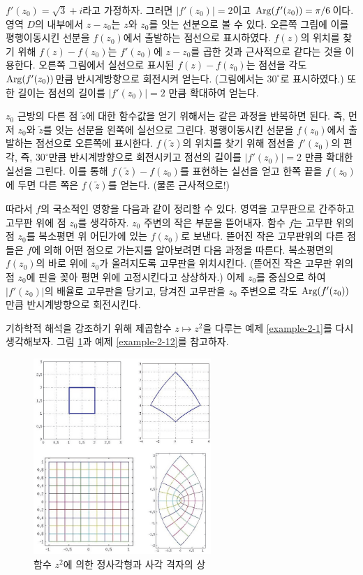 $f'(z_0) = \sqrt{3} +i$라고 가정하자.
그러면 $|f'(z_0)| = 2$이고 $\mathop{\mathrm{Arg}}(f'(z_0))=\pi/6$이다.
영역 $D$의 내부에서 $z-z_0$는 $z$와 $z_0$를 잇는 선분으로 볼 수 있다.
오른쪽 그림에 이를 평행이동시킨 선분을 $f(z_0)$에서 출발하는 점선으로 표시하였다.
$f(z)$의 위치를 찾기 위해
$f(z)-f(z_0)$는 $f'(z_0)$에 $z-z_0$를 곱한 것과 근사적으로 같다는 것을 이용한다.
오른쪽 그림에서 실선으로 표시된 $f(z)-f(z_0)$는
점선을 각도 $\mathop{\mathrm{Arg}}(f'(z_0))$만큼 반시계방향으로 회전시켜 얻는다.
(그림에서는 $30^\circ$로 표시하였다.)
또한 길이는 점선의 길이를 $|f'(z_0)|=2$ 만큼 확대하여 얻는다.

$z_0$ 근방의 다른 점 $\tilde z$에 대한 함수값을 얻기 위해서는 
같은 과정을 반복하면 된다.
즉, 먼저 $z_0$와  $\tilde z$를 잇는 선분을 왼쪽에 실선으로 그린다.
평행이동시킨 선분을 $f(z_0)$에서 출발하는 점선으로 오른쪽에 표시한다.
$f(\tilde z)$의 위치를 찾기 위해
점선을 $f'(z_0)$의 편각, 즉, $30^\circ$만큼 반시계방향으로 회전시키고
점선의 길이를 $|f'(z_0)|=2$ 만큼 확대한 실선을 그린다.
이를 통해 $f(\tilde z) - f(z_0)$를 표현하는 실선을 얻고
한쪽 끝을 $f(z_0)$ 에 두면 다른 쪽은 $f(\tilde z)$를 얻는다. (물론 근사적으로!)

따라서 $f$의 국소적인 영향을 다음과 같이 정리할 수 있다.
영역을 고무판으로 간주하고 고무판 위에 점 $z_0$를 생각하자.
$z_0$ 주변의 작은 부분을 뜯어내자.
함수 $f$는 고무판 위의 점 $z_0$를 복소평면 위 어딘가에 있는 $f(z_0)$로 보낸다.
뜯어진 작은 고무판위의 다른 점들은 $f$에 의해 어떤 점으로 가는지를
알아보려면 다음 과정을 따른다.
복소평면의 $f(z_0)$의 바로 위에 $z_0$가 올려지도록 고무판을 위치시킨다.
(뜯어진 작은 고무판 위의 점 $z_0$에 핀을 꽂아 평면 위에 고정시킨다고 상상하자.)
이제 $z_0$를 중심으로 하여 $|f'(z_0)|$의 배율로 고무판을 당기고,
당겨진 고무판을 $z_0$ 주변으로 각도 $\mathop{\mathrm{Arg}}(f'(z_0))$만큼 반시계방향으로 회전시킨다.

기하학적 해석을 강조하기 위해
제곱함수 $z\mapsto z^2$을 다루는
예제 \ref{example-2-1}를 다시 생각해보자.
그림 \ref{fig-2-10}과 예제 \ref{example-2-12}를 참고하자.

\begin{figure}[!h]
\begin{center}
\includegraphics[width=0.6\textwidth]{./SaltChapter/figs/fig-2-10}
\end{center}
\caption{함수 $z^2$에 의한 정사각형과 사각 격자의 상}
\label{fig-2-10}
\end{figure}

